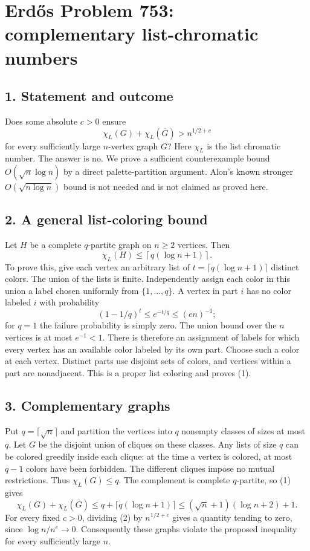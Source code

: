 \section*{Erd\H{o}s Problem 753: complementary list-chromatic numbers}
\subsection*{1. Statement and outcome}
Does some absolute $c>0$ ensure
\[
 \chi_L(G)+\chi_L(\overline G)>n^{1/2+c}
\]
for every sufficiently large $n$-vertex graph $G$? Here $\chi_L$ is the list chromatic number. The answer is no. We prove a sufficient counterexample bound $O(\sqrt n\log n)$ by a direct palette-partition argument. Alon's known stronger $O(\sqrt{n\log n})$ bound is not needed and is not claimed as proved here.
\subsection*{2. A general list-coloring bound}
Let $H$ be a complete $q$-partite graph on $n\ge2$ vertices. Then
\[
 \chi_L(H)\le \left\lceil q(\log n+1)\right\rceil. \tag{1}
\]
To prove this, give each vertex an arbitrary list of $t=\lceil q(\log n+1)\rceil$ distinct colors. The union of the lists is finite. Independently assign each color in this union a label chosen uniformly from $\{1,\ldots,q\}$. A vertex in part $i$ has no color labeled $i$ with probability
\[
 (1-1/q)^t\le e^{-t/q}\le (en)^{-1};
\]
for $q=1$ the failure probability is simply zero. The union bound over the $n$ vertices is at most $e^{-1}<1$. There is therefore an assignment of labels for which every vertex has an available color labeled by its own part. Choose such a color at each vertex. Distinct parts use disjoint sets of colors, and vertices within a part are nonadjacent. This is a proper list coloring and proves (1).
\subsection*{3. Complementary graphs}
Put $q=\lceil\sqrt n\rceil$ and partition the vertices into $q$ nonempty classes of sizes at most $q$. Let $G$ be the disjoint union of cliques on these classes. Any lists of size $q$ can be colored greedily inside each clique: at the time a vertex is colored, at most $q-1$ colors have been forbidden. The different cliques impose no mutual restrictions. Thus $\chi_L(G)\le q$.
The complement is complete $q$-partite, so (1) gives
\[
 \chi_L(G)+\chi_L(\overline G)
 \le q+\lceil q(\log n+1)\rceil
 \le (\sqrt n+1)(\log n+2)+1. \tag{2}
\]
For every fixed $c>0$, dividing (2) by $n^{1/2+c}$ gives a quantity tending to zero, since $\log n/n^c\to0$. Consequently these graphs violate the proposed inequality for every sufficiently large $n$.
